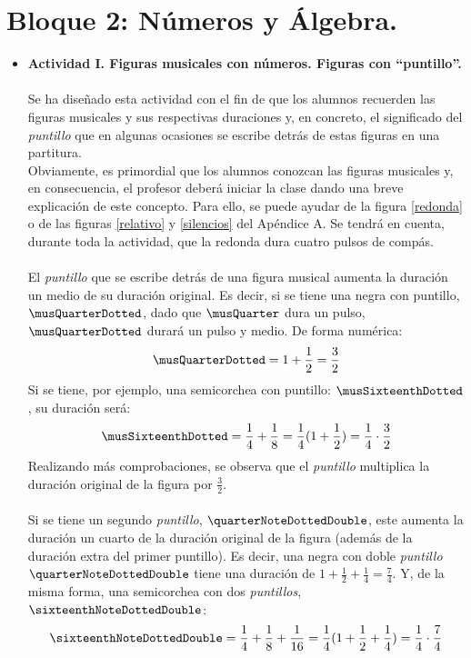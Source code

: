 \documentclass[a4paper, openright, 11pt, titlepage]{report}
\theoremstyle{definition}\newtheorem{defin}[propo]{Definition}
\theoremstyle{definition}\newtheorem{obser}[propo]{Remark}
\theoremstyle{definition}\newtheorem{ejem}[propo]{Ejemplo}
\theoremstyle{definition}\newtheorem{algoritmo}[propo]{Algoritmo}
\begin{document}
\section{Bloque 2: Números y Álgebra.}
\begin{itemize}
    \item \textbf{Actividad I. Figuras musicales con números. Figuras con ``puntillo''.}\\\\
    Se ha diseñado esta actividad con el fin de que los alumnos recuerden las figuras musicales y sus respectivas duraciones y, en concreto, el significado del \textit{puntillo} que en algunas ocasiones se escribe detrás de estas figuras en una partitura.\\
   Obviamente, es primordial que los alumnos conozcan las figuras musicales y, en consecuencia, el profesor deberá iniciar la clase dando una breve explicación de este concepto. Para ello, se puede ayudar de la figura \ref{redonda} o de las figuras \ref{relativo} y \ref{silencios} del Apéndice A. Se tendrá en cuenta, durante toda la actividad, que la redonda dura cuatro pulsos de compás.\\\\
    El \textit{puntillo} que se escribe detrás de una figura musical aumenta la duración un medio de su duración original. Es decir, si se tiene una negra con puntillo, $\musQuarterDotted$, dado que $\musQuarter$ dura un pulso, $\musQuarterDotted$ durará un pulso y medio. De forma numérica: $$\musQuarterDotted = 1 + \frac{1}{2} = \frac{3}{2}$$
    Si se tiene, por ejemplo, una semicorchea con puntillo: $\musSixteenthDotted$, su duración será: $$\musSixteenthDotted = \frac{1}{4} + \frac{1}{8} = \frac{1}{4}(1 + \frac{1}{2}) = \frac{1}{4}\cdot\frac{3}{2}$$
    Realizando más comprobaciones, se observa que el \textit{puntillo} multiplica la duración original de la figura por $\frac{3}{2}$.\\\\
    Si se tiene un segundo \textit{puntillo}, $\quarterNoteDottedDouble$, este aumenta la duración un cuarto de la duración original de la figura (además de la duración extra del primer puntillo). Es decir, una negra con doble \textit{puntillo} $\quarterNoteDottedDouble$ tiene una duración de $1 + \frac{1}{2} + \frac{1}{4} = \boxed{\frac{7}{4}}$. Y, de la misma forma, una semicorchea con dos \textit{puntillos}, $\sixteenthNoteDottedDouble$: $$\sixteenthNoteDottedDouble = \frac{1}{4} + \frac{1}{8} + \frac{1}{16} = \frac{1}{4}(1+\frac{1}{2} + \frac{1}{4}) = \frac{1}{4}\cdot\frac{7}{4}$$

\end{itemize}
\end{document}
